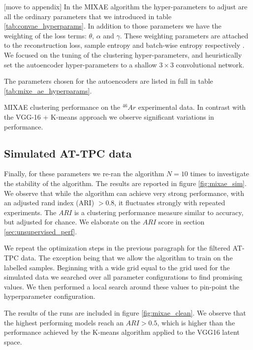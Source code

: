 \documentclass[review,number,sort&compress]{elsarticle}
\begin{document}
{\color{orange}[move to appendix]}
In the MIXAE algorithm the hyper-parameters to adjust are all the ordinary parameters that we introduced in table \ref{tab:convae_hyperparams}. In addition to those parameters we have the weighting of the loss terms: $\theta$, $\alpha$ and $\gamma$. These weighting parameters are attached to the reconstruction loss, sample entropy and batch-wise entropy respectively \cite{Zhang}. 
We focused on the tuning of the clustering hyper-parameters, and heuristically set the autoencoder hyper-parameters to a shallow $3\times3$ convolutional network.  

The parameters chosen for the autoencoders are listed in full in table \ref{tab:mixe_ae_hyperparams}.

\begin{table}[H]
\centering 
\caption[MIXAE clustering performance]{MIXAE clustering performance on the ${}^{46} Ar$ experimental data. In contrast with the VGG-16 + K-means approach we observe  significant variations in performance.}\label{tab:clstr_vgg}

\end{table}

\subsection{Simulated AT-TPC data}


Finally, for these parameters we re-ran the algorithm $N=10$ times to investigate the stability of the algorithm. The results are reported in figure \ref{fig:mixae_sim}. We observe that while the algorithm can achieve very strong performance, with an adjusted rand index (ARI) $ > 0.8$, it fluctuates strongly with repeated experiments. The $ARI$ is a clustering performance measure similar to accuracy, but adjusted for chance. We elaborate on the $ARI$ score in section \ref{sec:unsupervised_perf}. 

We repeat the optimization steps in the previous paragraph for the filtered AT-TPC data. The exception being that we allow the algorithm to train on the labelled samples. Beginning with a wide grid equal to the grid used for the simulated data we searched over all parameter configurations to find promising values. We then performed a local search around these values to pin-point the hyperparameter configuration.

\noindent The results of the runs are included in figure \ref{fig:mixae_clean}. We observe that the highest performing models reach an $ARI > 0.5$, which is higher than the performance achieved by the K-means algorithm applied to the VGG16 latent space. 
\end{document}
